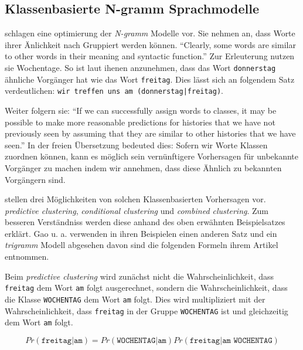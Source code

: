 \subsection{Klassenbasierte N-gramm Sprachmodelle}
\label{sec:brownClustering}
    
    \cite{cumpatationalLinguistics:classBasedNGramms} schlagen eine optimierung der \emph{N-gramm} Modelle vor. Sie nehmen an, dass Worte ihrer Änlichkeit nach Gruppiert werden können. \enquote{Clearly, some words are similar to other words in their meaning and syntactic function.} \parencite[S. 470]{cumpatationalLinguistics:classBasedNGramms} Zur Erleuterung nutzen sie Wochentage. So ist laut ihenen anzunehmen, dass das Wort \texttt{donnerstag} ähnliche Vorgänger hat wie das Wort \texttt{freitag}. Dies lässt sich an folgendem Satz verdeutlichen: \texttt{wir treffen uns am (donnerstag|freitag)}. 
    
    Weiter folgern sie: \enquote{If we can successfully assign words to classes, it may be possible to make more reasonable predictions for histories that we have not previously seen by assuming that they are similar to other histories that we have seen.} \parencite[S. 471]{cumpatationalLinguistics:classBasedNGramms} In der freien Übersetzung bedeuted dies: Sofern wir Worte Klassen zuordnen können, kann es möglich sein vernünftigere Vorhersagen für unbekannte Vorgänger zu machen indem wir annehmen, dass diese Ähnlich zu bekannten Vorgängern sind.
    
    \cite{cumpatationalLinguistics:theuse} stellen drei Möglichkeiten von solchen Klassenbasierten Vorhersagen vor. \emph{predictive clustering}, \emph{conditional clustering} und \emph{combined clustering}. Zum besseren Verständniss werden diese anhand des oben erwähnten Beispielsatzes erklärt. Gao u. a. verwenden in ihren Beispielen einen anderen Satz und ein \emph{trigramm} Modell abgesehen davon sind die folgenden Formeln ihrem Artikel entnommen. 
    
    Beim \emph{predictive clustering} wird zunächst nicht die Wahrscheinlichkeit, dass \texttt{freitag} dem Wort \texttt{am} folgt ausgerechnet, sondern die Wahrscheinlichkeit, dass die Klasse \texttt{WOCHENTAG} dem Wort \texttt{am} folgt. Dies wird multipliziert mit der Wahrscheinlichkeit, dass \texttt{freitag} in der Gruppe \texttt{WOCHENTAG} ist und gleichzeitig dem Wort \texttt{am} folgt.
   	
     \begin{equation}
   		Pr(\texttt{freitag}|\texttt{am}) = Pr(\texttt{WOCHENTAG}|\texttt{am}) Pr(\texttt{freitag}|\texttt{am WOCHENTAG})
        \label{eq:predictive-clustering-words}
	\end{equation}
    

